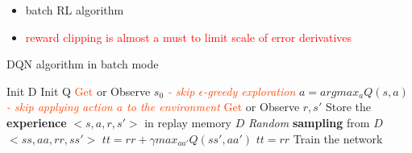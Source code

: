\documentclass[a4paper,12pt]{article}
\begin{document}
\begin{itemize}
    \item batch RL algorithm
    \item \textcolor{red}{reward clipping is almost a must to limit scale of error derivatives} \cite{Francois-Lavet2018}
\end{itemize}

\begin{algorithm}[H]
\caption{DQN algorithm in batch mode}
\label{alg:DQN}
\begin{algorithmic}[1]
    \State Init D \Comment{\textcolor{BlueViolet}{replay memory}}
    \State Init Q \Comment{\textcolor{BlueViolet}{Q-table w/ random weights}}
    \State \textcolor{OrangeRed}{Get} or Observe $s_0$ \Comment{\textcolor{BlueViolet}{the initial state}}
            \State \textit{\textcolor{OrangeRed}{- skip $\epsilon$-greedy exploration}}
            \State $a = argmax_a Q(s,a)$
            \State \textit{\textcolor{OrangeRed}{- skip applying action $a$ to the environment}}
            \State \textcolor{OrangeRed}{Get} or Observe $r, s'$
            \State Store the \textbf{experience} $<s, a, r, s'>$ in replay memory $D$
            \State \textit{Random} \textbf{sampling} from $D$ $<ss, aa, rr, ss'>$  \Comment{\textcolor{BlueViolet}{[mini]-batch}}
             \Comment{\textcolor{BlueViolet}{target for each mini-batch}}
                \State $tt = rr + \gamma max_{aa'} Q(ss', aa')$
            \Else
                \State $tt = rr$
            \EndIf
            \State Train the network
        \EndFor    
    \EndFor
\end{algorithmic}
\end{algorithm}
\end{document}
